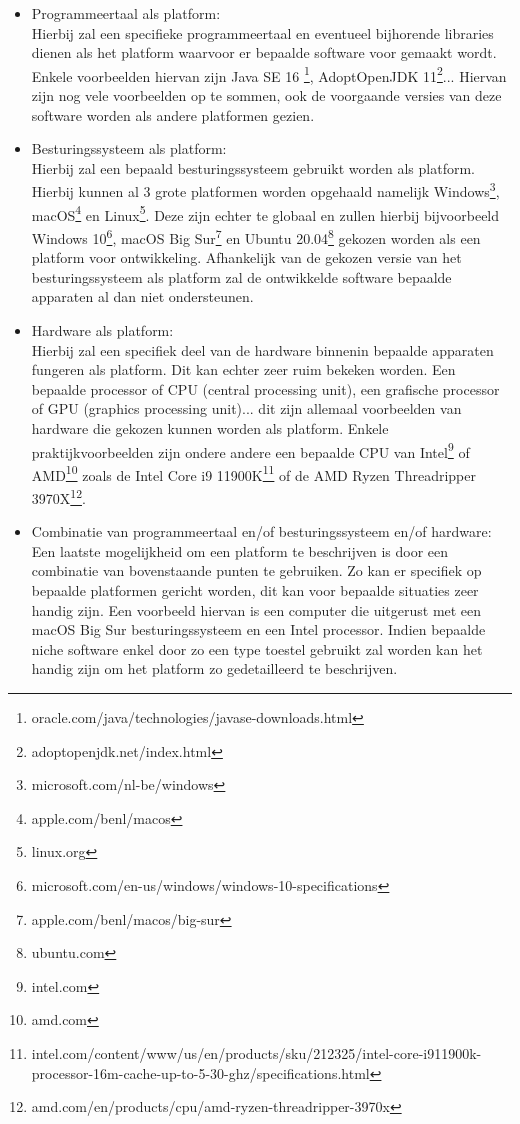 \begin{itemize}
\item Programmeertaal als platform:\\
Hierbij zal een specifieke programmeertaal en eventueel bijhorende libraries dienen als het platform waarvoor er bepaalde software voor gemaakt wordt. Enkele voorbeelden hiervan zijn Java SE 16 \footnote{oracle.com/java/technologies/javase-downloads.html}, AdoptOpenJDK 11\footnote{adoptopenjdk.net/index.html}... Hiervan zijn nog vele voorbeelden op te sommen, ook de voorgaande versies van deze software worden als andere platformen gezien.
\\

\item Besturingssysteem als platform:\\
Hierbij zal een bepaald besturingssysteem gebruikt worden als platform. Hierbij kunnen al 3 grote platformen worden opgehaald namelijk Windows\footnote{microsoft.com/nl-be/windows}, macOS\footnote{apple.com/benl/macos} en Linux\footnote{linux.org}. Deze zijn echter te globaal en zullen hierbij bijvoorbeeld Windows 10\footnote{microsoft.com/en-us/windows/windows-10-specifications}, macOS Big Sur\footnote{apple.com/benl/macos/big-sur} en Ubuntu 20.04\footnote{ubuntu.com} gekozen worden als een platform voor ontwikkeling. Afhankelijk van de gekozen versie van het besturingssysteem als platform zal de ontwikkelde software bepaalde apparaten al dan niet ondersteunen.
\\

\item Hardware als platform:\\
Hierbij zal een specifiek deel van de hardware binnenin bepaalde apparaten fungeren als platform. Dit kan echter zeer ruim bekeken worden. Een bepaalde processor of CPU (central processing unit), een grafische processor of GPU (graphics processing unit)... dit zijn allemaal voorbeelden van hardware die gekozen kunnen worden als platform. Enkele praktijkvoorbeelden zijn ondere andere een bepaalde CPU van Intel\footnote{intel.com} of AMD\footnote{amd.com} zoals de Intel Core i9 11900K\footnote{intel.com/content/www/us/en/products/sku/212325/intel-core-i911900k-processor-16m-cache-up-to-5-30-ghz/specifications.html} of de AMD Ryzen Threadripper 3970X\footnote{amd.com/en/products/cpu/amd-ryzen-threadripper-3970x}.
\\

\item Combinatie van programmeertaal en/of besturingssysteem en/of hardware: \\
Een laatste mogelijkheid om een platform te beschrijven is door een combinatie van bovenstaande punten te gebruiken. Zo kan er specifiek op bepaalde platformen gericht worden, dit kan voor bepaalde situaties zeer handig zijn. Een voorbeeld hiervan is een computer die uitgerust met een macOS Big Sur besturingssysteem en een Intel processor. Indien bepaalde niche software enkel door zo een type toestel gebruikt zal worden kan het handig zijn om het platform zo gedetailleerd te beschrijven.
\end{itemize}

